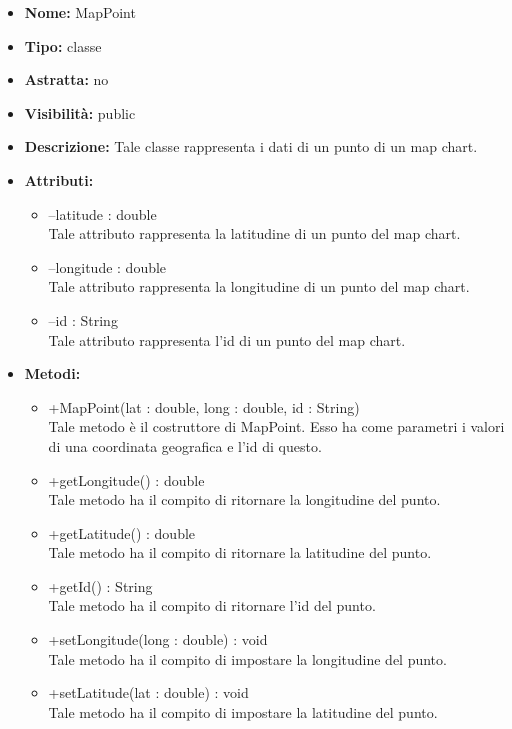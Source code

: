 			
			\begin{itemize}
			\item \textbf{Nome:} MapPoint
			\item \textbf{Tipo:} classe
			
		\item \textbf{Astratta:}
		no
			\item \textbf{Visibilità:} public
			\item \textbf{Descrizione:} Tale classe rappresenta i dati di un punto di un map chart.
			\item \textbf{Attributi:}
				\begin{itemize}
				\setlength{\itemsep}{5pt}
				
					\item[\ding{111}] {--latitude : double} \\ [1mm] Tale attributo rappresenta la latitudine di un punto del map chart.
					\item[\ding{111}] {--longitude : double} \\ [1mm] Tale attributo rappresenta la longitudine di un punto del map chart.
					\item[\ding{111}] {--id : String} \\ [1mm] Tale attributo rappresenta l'id di un punto del map chart.
				\end{itemize}
		
			\item \textbf{Metodi:}
				\begin{itemize}
				\setlength{\itemsep}{5pt}
				
					\item[\ding{111}] {{+MapPoint(lat : double, long : double, id : String)}} \\ [1mm] Tale metodo è il costruttore di MapPoint. Esso ha come parametri i valori di una coordinata geografica e l'id di questo.
					\item[\ding{111}] {{+getLongitude() : double}} \\ [1mm] Tale metodo ha il compito di ritornare la longitudine del punto.
					\item[\ding{111}] {{+getLatitude() : double}} \\ [1mm] Tale metodo ha il compito di ritornare la latitudine del punto.
					\item[\ding{111}] {{+getId() : String}} \\ [1mm] Tale metodo ha il compito di ritornare l'id del punto.
					\item[\ding{111}] {{+setLongitude(long : double) : void}} \\ [1mm] Tale metodo ha il compito di impostare la longitudine del punto.
					\item[\ding{111}] {{+setLatitude(lat : double) : void}} \\ [1mm] Tale metodo ha il compito di impostare la latitudine del punto.
				\end{itemize}
		
			\end{itemize}
	
